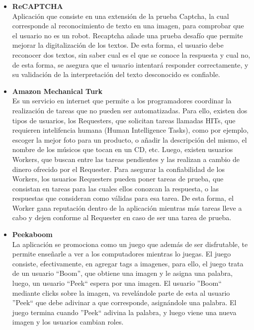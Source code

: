 \documentclass[10pt,letterpaper]{article}
\begin{document}
\begin{itemize}
 \item \textbf{ReCAPTCHA}\\

Aplicación que consiste en una extensión de la prueba Captcha, la cual corresponde al reconocimiento de texto en una imagen, para comprobar que el usuario no es un robot. Recaptcha añade una prueba desafío que permite mejorar la digitalización de los textos. De esta forma, el usuario debe reconocer dos textos, sin saber cual es el que se conoce la respuesta y cual no, de esta forma, se asegura que el usuario intentará responder correctamente, y su validación de la interpretación del texto desconocido es confiable.\\

 \item \textbf{Amazon Mechanical Turk}\\

Es un servicio en internet que permite a los programadores coordinar la realización de tareas que no pueden ser automatizadas. Para ello, existen dos tipos de usuarios, los Requesters, que solicitan tareas llamadas HITs, que requieren intelifencia humana (Human Intelligence Tasks), como por ejemplo, escoger la mejor foto para un producto, o añadir la descripción del mismo, el nombre de los músicos que tocan en un CD, etc. Luego, existen usuarios Workers, que buscan entre las tareas pendientes y las realizan a cambio de dinero ofrecido por el Requester. Para asegurar la confiabilidad de los Workers, los usuarios Requesters pueden poner tareas de prueba, que consistan en tareas para las cuales ellos conozcan la respuesta, o las respuestas que consideran como válidas para esa tarea. De esta forma, el Worker gana reputación dentro de la aplicación mientras más tareas lleve a cabo y dejen conforme al Requester en caso de ser una tarea de prueba.

\item \textbf{Peekaboom}\\

La aplicación se promociona como un juego que además de ser disfrutable, te permite  enseñarle a ver a los computadores mientras lo juegas. El juego consiste, efectivamente, en agregar tags a imagenes, para ello, el juego trata de un usuario ``Boom'', que obtiene una imagen y le asigna una palabra, luego, un usuario ``Peek`` espera por una imagen. El usuario ''Boom`` mediante clicks sobre la imagen, va revelándole parte de esta al usuario ''Peek`` que debe adivinar a que corresponde, asignándole una palabra. El juego termina cuando ''Peek`` adivina la palabra, y luego viene una nueva imagen y los usuarios cambian roles.
\end{itemize}
\end{document}
